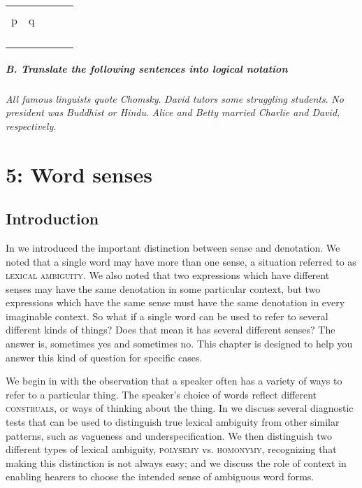 \begin{tabularx}{\textwidth}{XXXXX}
\lsptoprule
&  &  &  & \\
 p & q &  &  & \\
\midrule
&  &  &  & \\
&  &  &  & \\
&  &  &  & \\
\lspbottomrule
\end{tabularx}

\paragraph{B. Translate the following sentences into logical notation}

\ea \ea \textit{All famous linguists quote Chomsky}.
\ex \textit{David tutors some struggling students}.
\ex \textit{No president was Buddhist or Hindu}.
\ex \textit{Alice and Betty married Charlie and David, respectively.}
\z
                       \z

\chapter{{5}: Word senses}

\section{Introduction}\label{sec:} %

In  we introduced the important distinction between sense and denotation. We noted that a single word may have more than one sense, a situation referred to as \textsc{lexical ambiguity}. We also noted that two expressions which have different senses may have the same denotation in some particular context, but two expressions which have the same sense must have the same denotation in every imaginable context. So what if a single word can be used to refer to several different kinds of things? Does that mean it has several different senses? The answer is, sometimes yes and sometimes no. This chapter is designed to help you answer this kind of question for specific cases.



We begin in  with the observation that a speaker often has a variety of ways to refer to a particular thing. The speaker’s choice of words reflect different \textsc{construals}, or ways of thinking about the thing. In  we discuss several diagnostic tests that can be used to distinguish true lexical ambiguity from other similar patterns, such as vagueness and underspecification. We then distinguish two different types of lexical ambiguity, \textsc{polysemy} vs. \textsc{homonymy}, recognizing that making this distinction is not always easy; and we discuss the role of context in enabling hearers to choose the intended sense of ambiguous word forms.



